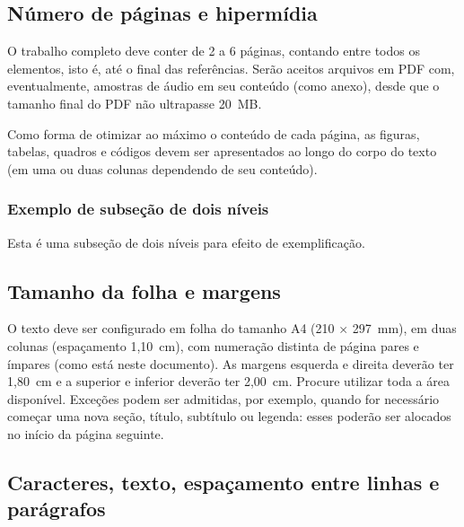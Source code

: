 \subsection{Número de páginas e hipermídia}

O trabalho completo deve conter de 2 a 6 páginas, contando entre todos os elementos, isto é, até o final das referências. Serão aceitos arquivos em PDF com, eventualmente, amostras de áudio em seu conteúdo (como anexo), desde que o tamanho final do PDF não ultrapasse 20~MB.

Como forma de otimizar ao máximo o conteúdo de cada página, as figuras, tabelas, quadros e códigos devem ser apresentados ao longo do corpo do texto (em uma ou duas colunas dependendo de seu conteúdo).

\subsubsection{Exemplo de subseção de dois níveis}

Esta é uma subseção de dois níveis para efeito de exemplificação.

\subsection{Tamanho da folha e margens}

O texto deve ser configurado em folha do tamanho A4 (210 $\times$ 297~mm), em duas colunas (espaçamento 1,10~cm), com numeração distinta de página pares e ímpares (como está neste documento). As margens esquerda e direita deverão ter 1,80~cm e a superior e inferior deverão ter 2,00~cm. Procure utilizar toda a área disponível. Exceções podem ser admitidas, por exemplo, quando for necessário começar uma nova seção, título, subtítulo ou legenda: esses poderão ser alocados no início da página seguinte.

\subsection{Caracteres, texto, espaçamento entre linhas e parágrafos}

